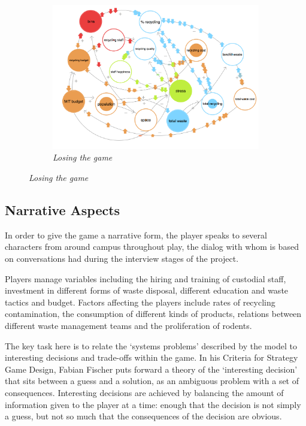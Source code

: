 \documentclass[nofonts,nols,justified,nobib]{tufte-book}
\begin{document}
\begin{figure}
\begin{subfigure}{.3\textwidth}
  \includegraphics[width=1\linewidth]{img/3/loopy/big-lose.png}
  \caption{\textit{Losing the game}}
  \label{small:lose}
\end{subfigure}%
\end{figure}
\vspace{0.8cm}

\subsection*{Narrative Aspects}

In order to give the game a narrative form, the player speaks to several characters from around campus throughout play, the dialog with whom is based on conversations had during the interview stages of the project.

Players manage variables including the hiring and training of custodial staff, investment in different forms of waste disposal, different education and waste tactics and budget. Factors affecting the players include rates of recycling contamination, the consumption of different kinds of products, relations between different waste management teams and the proliferation of rodents.

The key task here is to relate the `systems problems' described by the model to interesting decisions and trade-offs within the game. In his Criteria for Strategy Game Design, Fabian Fischer \cite{fischer_criteria_2014} puts forward a theory of the `interesting decision' that sits between a guess and a solution, as an ambiguous problem with a set of consequences. Interesting decisions are achieved by balancing the amount of information given to the player at a time: enough that the decision is not simply a guess, but not so much that the consequences of the decision are obvious.
\end{document}
